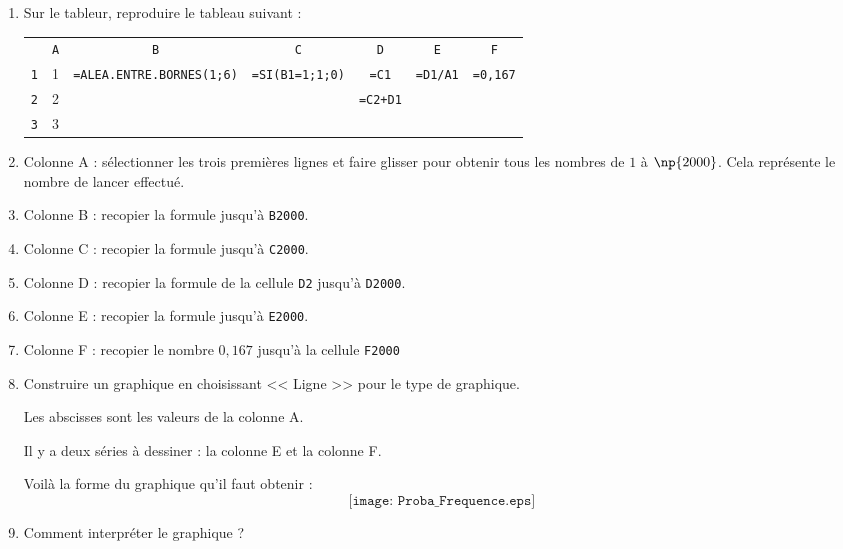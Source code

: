 \documentclass[10pt,french]{article}
\begin{document}
\begin{enumerate}
    \item Sur le tableur, reproduire le tableau suivant :
        {\small\begin{center}
        \begin{tabular}{c|c|c|c|c|c|c|}
           \multicolumn{1}{c}{} & \multicolumn{1}{c}{\texttt{A}} & \multicolumn{1}{c}{\texttt{B}} & \multicolumn{1}{c}{\texttt{C}} & \multicolumn{1}{c}{\texttt{D}} & \multicolumn{1}{c}{\texttt{E}} & \multicolumn{1}{c}{\texttt{F}}  \\
            \cline{2-7}
            \texttt 1 & 1 & \verb!=ALEA.ENTRE.BORNES(1;6)! & \verb!=SI(B1=1;1;0)! & \verb!=C1! & \verb!=D1/A1! & \verb!=0,167! \\
            \cline{2-7}
            \texttt 2 & 2 & & & \verb!=C2+D1! & &  \\
            \cline{2-7}
            \texttt 3 & 3 & & & & &  \\
        \end{tabular}
    \end{center}}
    \item Colonne A : sélectionner les trois premières lignes et faire glisser pour obtenir tous les nombres de $1$ à $\np{2000}$. Cela représente le nombre de lancer effectué.
    \item Colonne B : recopier la formule jusqu'à \verb!B2000!.
    \item Colonne C : recopier la formule jusqu'à \verb!C2000!.
    \item Colonne D : recopier la formule de la cellule \verb!D2! jusqu'à \verb!D2000!.
    \item Colonne E : recopier la formule jusqu'à \verb!E2000!.
    \item Colonne F : recopier le nombre $0,167$ jusqu'à la cellule \verb!F2000!
    \item Construire un graphique en choisissant << Ligne >> pour le type de graphique.\par
    Les abscisses sont les valeurs de la colonne A.\par
    Il y a deux séries à dessiner : la colonne E et la colonne F.\par
    Voilà la forme du graphique qu'il faut obtenir :
        \[\texttt{[image: Proba\_Frequence.eps]}\]
    \item Comment interpréter le graphique ?
\end{enumerate}
\end{document}
